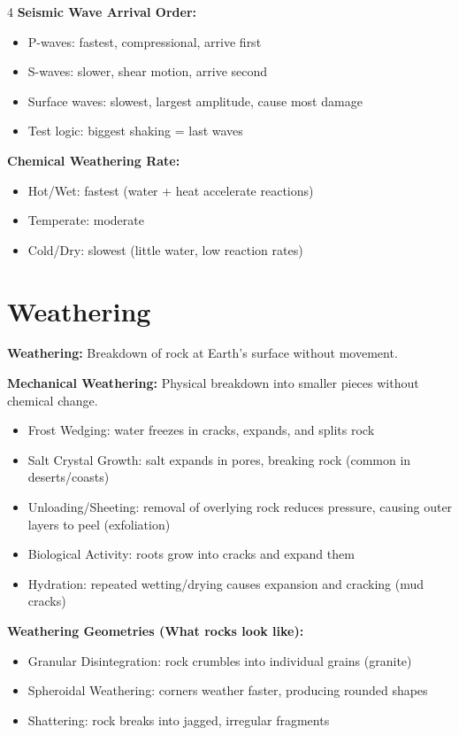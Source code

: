 \documentclass[10pt]{article}
\begin{document}
\begin{multicols}{4}
\textbf{Seismic Wave Arrival Order:}
\begin{itemize}
\item P-waves: fastest, compressional, arrive first
\item S-waves: slower, shear motion, arrive second
\item Surface waves: slowest, largest amplitude, cause most damage
\item Test logic: biggest shaking = last waves
\end{itemize}

\textbf{Chemical Weathering Rate:}
\begin{itemize}
\item Hot/Wet: fastest (water + heat accelerate reactions)
\item Temperate: moderate
\item Cold/Dry: slowest (little water, low reaction rates)
\end{itemize}

\section*{Weathering}

\textbf{Weathering:}
Breakdown of rock at Earth’s surface without movement.

\textbf{Mechanical Weathering:}
Physical breakdown into smaller pieces without chemical change.
\begin{itemize}
\item Frost Wedging: water freezes in cracks, expands, and splits rock
\item Salt Crystal Growth: salt expands in pores, breaking rock (common in deserts/coasts)
\item Unloading/Sheeting: removal of overlying rock reduces pressure, causing outer layers to peel (exfoliation)
\item Biological Activity: roots grow into cracks and expand them
\item Hydration: repeated wetting/drying causes expansion and cracking (mud cracks)
\end{itemize}

\textbf{Weathering Geometries (What rocks look like):}
\begin{itemize}
\item Granular Disintegration: rock crumbles into individual grains (granite)
\item Spheroidal Weathering: corners weather faster, producing rounded shapes
\item Shattering: rock breaks into jagged, irregular fragments
\end{itemize}


\end{multicols}
\end{document}

